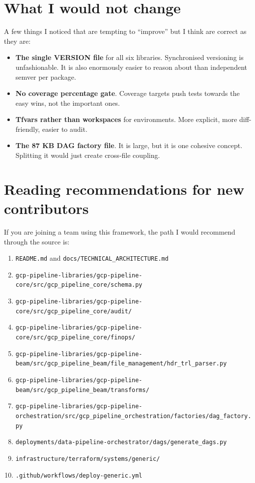 \documentclass[
  11pt,
  british,
  oneside]{book}
\providecommand{\tightlist}{%
  \setlength{\itemsep}{0pt}\setlength{\parskip}{0pt}}
\begin{document}
\hypertarget{what-i-would-not-change}{%
\section{What I would not change}\label{what-i-would-not-change}}

A few things I noticed that are tempting to ``improve'' but I think are
correct as they are:

\begin{itemize}
\tightlist
\item
  \textbf{The single VERSION file} for all six libraries. Synchronised
  versioning is unfashionable. It is also enormously easier to reason
  about than independent semver per package.
\item
  \textbf{No coverage percentage gate}. Coverage targets push tests
  towards the easy wins, not the important ones.
\item
  \textbf{Tfvars rather than workspaces} for environments. More
  explicit, more diff-friendly, easier to audit.
\item
  \textbf{The 87 KB DAG factory file}. It is large, but it is one
  cohesive concept. Splitting it would just create cross-file coupling.
\end{itemize}

\hypertarget{reading-recommendations-for-new-contributors}{%
\section{Reading recommendations for new
contributors}\label{reading-recommendations-for-new-contributors}}

If you are joining a team using this framework, the path I would
recommend through the source is:

\begin{enumerate}
\def\labelenumi{\arabic{enumi}.}
\tightlist
\item
  \texttt{README.md} and \texttt{docs/TECHNICAL\_ARCHITECTURE.md}
\item
  \texttt{gcp-pipeline-libraries/gcp-pipeline-core/src/gcp\_pipeline\_core/schema.py}
\item
  \texttt{gcp-pipeline-libraries/gcp-pipeline-core/src/gcp\_pipeline\_core/audit/}
\item
  \texttt{gcp-pipeline-libraries/gcp-pipeline-core/src/gcp\_pipeline\_core/finops/}
\item
  \texttt{gcp-pipeline-libraries/gcp-pipeline-beam/src/gcp\_pipeline\_beam/file\_management/hdr\_trl\_parser.py}
\item
  \texttt{gcp-pipeline-libraries/gcp-pipeline-beam/src/gcp\_pipeline\_beam/transforms/}
\item
  \texttt{gcp-pipeline-libraries/gcp-pipeline-orchestration/src/gcp\_pipeline\_orchestration/factories/dag\_factory.py}
\item
  \texttt{deployments/data-pipeline-orchestrator/dags/generate\_dags.py}
\item
  \texttt{infrastructure/terraform/systems/generic/}
\item
  \texttt{.github/workflows/deploy-generic.yml}
\end{enumerate}
\end{document}
